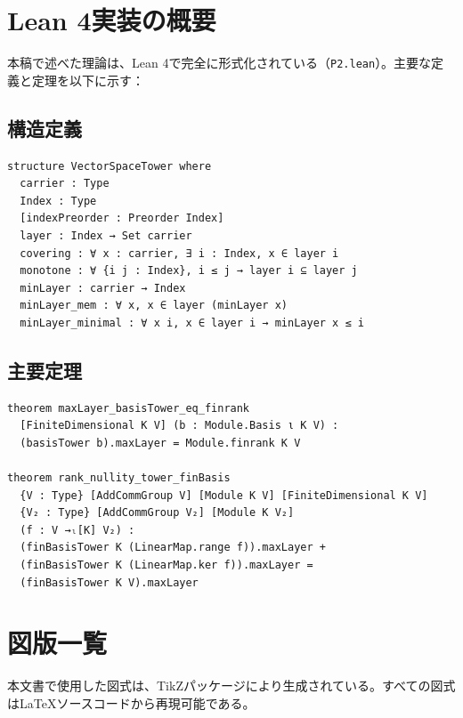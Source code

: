 \documentclass[a4paper,11pt]{ltjsarticle}
\theoremstyle{definition}
\begin{document}
\appendix

\section{Lean 4実装の概要}

本稿で述べた理論は、Lean 4で完全に形式化されている（\texttt{P2.lean}）。主要な定義と定理を以下に示す：

\subsection{構造定義}

\begin{verbatim}
structure VectorSpaceTower where
  carrier : Type
  Index : Type
  [indexPreorder : Preorder Index]
  layer : Index → Set carrier
  covering : ∀ x : carrier, ∃ i : Index, x ∈ layer i
  monotone : ∀ {i j : Index}, i ≤ j → layer i ⊆ layer j
  minLayer : carrier → Index
  minLayer_mem : ∀ x, x ∈ layer (minLayer x)
  minLayer_minimal : ∀ x i, x ∈ layer i → minLayer x ≤ i
\end{verbatim}

\subsection{主要定理}

\begin{verbatim}
theorem maxLayer_basisTower_eq_finrank
  [FiniteDimensional K V] (b : Module.Basis ι K V) :
  (basisTower b).maxLayer = Module.finrank K V

theorem rank_nullity_tower_finBasis
  {V : Type} [AddCommGroup V] [Module K V] [FiniteDimensional K V]
  {V₂ : Type} [AddCommGroup V₂] [Module K V₂]
  (f : V →ₗ[K] V₂) :
  (finBasisTower K (LinearMap.range f)).maxLayer +
  (finBasisTower K (LinearMap.ker f)).maxLayer =
  (finBasisTower K V).maxLayer
\end{verbatim}

\section{図版一覧}

本文書で使用した図式は、TikZパッケージにより生成されている。すべての図式は\LaTeX{}ソースコードから再現可能である。
\end{document}
